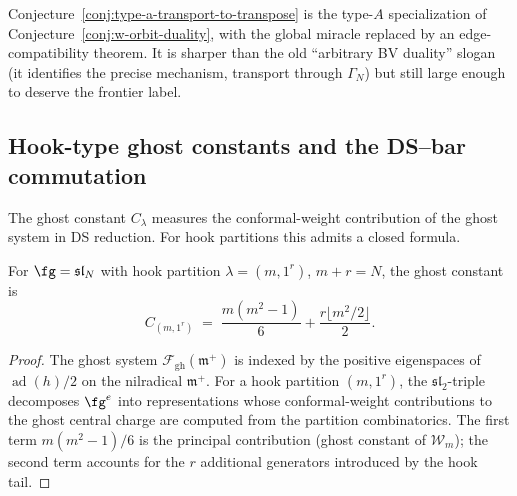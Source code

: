 \begin{remark}
Conjecture~\ref{conj:type-a-transport-to-transpose} is the
type-$A$ specialization of Conjecture~\ref{conj:w-orbit-duality},
with the global miracle replaced by an edge-compatibility
theorem. It is sharper than the old ``arbitrary BV duality''
slogan (it identifies the precise mechanism, transport through
$\Gamma_N$) but still large enough to deserve the frontier label.
\end{remark}

\subsection{Hook-type ghost constants and the DS--bar commutation}
\label{sec:hook-ghost-ds-bar}

The ghost constant $C_\lambda$ measures the conformal-weight
contribution of the ghost system in DS reduction.
For hook partitions this admits a closed formula.

\begin{proposition}
\label{prop:hook-ghost-constant}
For $\fg = \mathfrak{sl}_N$ with hook partition
$\lambda = (m, 1^r)$, $m + r = N$, the ghost constant is
\begin{equation}\label{eq:hook-ghost-constant}
C_{(m,1^r)} \;=\; \frac{m(m^2-1)}{6}
 + \frac{r \lfloor m^2/2 \rfloor}{2}.
\end{equation}
\end{proposition}

\begin{proof}
The ghost system $\mathcal{F}_{\mathrm{gh}}(\mathfrak{m}^+)$
is indexed by the positive eigenspaces of $\operatorname{ad}(h)/2$
on the nilradical $\mathfrak{m}^+$. For a hook partition
$(m,1^r)$, the $\mathfrak{sl}_2$-triple decomposes $\fg^e$ into
representations whose conformal-weight contributions to the
ghost central charge are computed from the partition combinatorics.
The first term $m(m^2-1)/6$ is the principal contribution
(ghost constant of $\mathcal{W}_m$); the second term accounts for
the $r$ additional generators introduced by the hook tail.
\end{proof}

